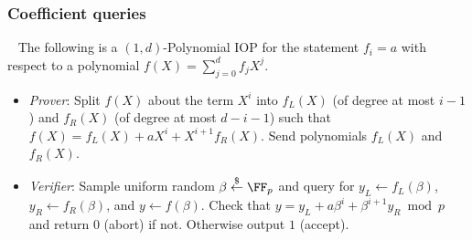 \subsubsection{Coefficient queries}~\label{sec:opencoefficient} 
The following is a $(1, d)$-Polynomial IOP for the statement $f_i = a$ with respect to a polynomial $f(X) = \sum_{j=0}^d f_j X^j$. %

\begin{itemize}

\item \emph{Prover}: Split $f(X)$ about the term $X^i$ into  $f_L(X)$ (of degree at most $i-1$) and $f_R(X)$ (of degree at most $d-i-1$) such that $f(X) = f_L(X) + a X^i + X^{i+1} f_R(X)$. Send polynomials $f_L(X)$ and $f_R(X)$. 


\item \emph{Verifier}: Sample uniform random  $\beta \sample \FF_p$ and query for $y_L \leftarrow f_L(\beta)$, $y_R \leftarrow f_R(\beta)$, and $y \leftarrow f(\beta)$. 
Check that $y = y_L + a \beta^i + \beta^{i+1} y_R \bmod p$ and return $0$ (abort) if not. Otherwise output $1$ (accept). 



\end{itemize}

